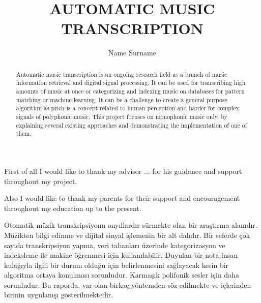 \documentclass[a4paper,12pt]{report}
\title{AUTOMATIC MUSIC TRANSCRIPTION}
\author{Name Surname}
\begin{document}


\makecoverpage
    
\clearpage\mbox{}
\clearpage    
\addtocounter{page}{-1}
    
\makeapprovalpage

\begin{acknowledgements}
First of all I would like to thank my advisor ... 
for his guidance and support throughout my project.

Also I would like to thank my parents for their support and encouragement throughout my education up to the present.
\end{acknowledgements}

\begin{abstract}
Automatic music transcription is an ongoing research field as a branch of music information retrieval and digital signal processing.  It can be used for transcribing high amounts of music at once or categorizing and indexing music on databases for pattern matching or machine learning. It can be a challenge to create a general purpose algorithm as pitch is a concept related to human perception and harder for complex signals of polyphonic music. This project focuses on monophonic music only, by explaining several existing approaches and demonstrating the implementation of one of them.
\end{abstract}

\begin{ozet}
Otomatik müzik transkripsiyonu onyıllardır sürmekte olan bir araştırma alanıdır. Müzikten bilgi edinme ve dijital sinyal işlemenin bir alt dalıdır. Bir seferde çok sayıda transkripsiyon yapma, veri tabanları üzerinde kategorizasyon ve indeksleme ile makine öğrenmesi için kullanılabilir. Duyulan bir nota insan kulağıyla ilgili bir durum olduğu için belirlenmesini sağlayacak kesin bir algoritma ortaya konulması sorunludur. Karmaşık polifonik sesler için daha sorunludur. Bu raporda, var olan birkaç yöntemden söz edilmekte ve içlerinden birinin uygulanışı gösterilmektedir.
\end{ozet}

\tableofcontents

\listoffigures

\listoftables
\end{document}
